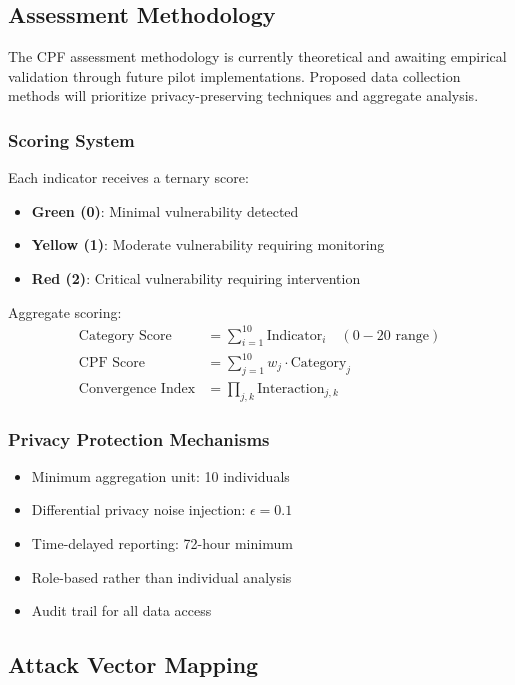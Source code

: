 \documentclass[11pt,a4paper]{article}
\begin{document}
\subsection{Assessment Methodology}

The CPF assessment methodology is currently theoretical and awaiting empirical validation through future pilot implementations. Proposed data collection methods will prioritize privacy-preserving techniques and aggregate analysis.

\subsubsection{Scoring System}

Each indicator receives a ternary score:
\begin{itemize}
\item \textbf{Green (0)}: Minimal vulnerability detected
\item \textbf{Yellow (1)}: Moderate vulnerability requiring monitoring
\item \textbf{Red (2)}: Critical vulnerability requiring intervention
\end{itemize}

Aggregate scoring:
\begin{align}
\text{Category Score} &= \sum_{i=1}^{10} \text{Indicator}_i \quad (0-20 \text{ range}) \\
\text{CPF Score} &= \sum_{j=1}^{10} w_j \cdot \text{Category}_j \\
\text{Convergence Index} &= \prod_{j,k} \text{Interaction}_{j,k}
\end{align}

\subsubsection{Privacy Protection Mechanisms}
\begin{itemize}
\item Minimum aggregation unit: 10 individuals
\item Differential privacy noise injection: $\epsilon = 0.1$
\item Time-delayed reporting: 72-hour minimum
\item Role-based rather than individual analysis
\item Audit trail for all data access
\end{itemize}

\subsection{Attack Vector Mapping}
\end{document}
